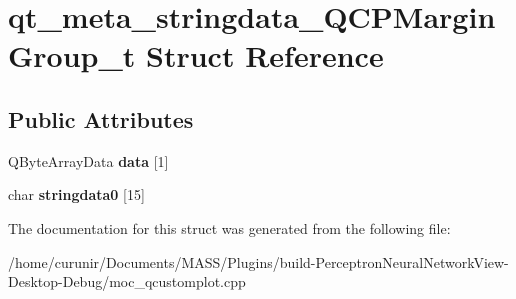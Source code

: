 \hypertarget{structqt__meta__stringdata___q_c_p_margin_group__t}{}\section{qt\+\_\+meta\+\_\+stringdata\+\_\+\+Q\+C\+P\+Margin\+Group\+\_\+t Struct Reference}
\label{structqt__meta__stringdata___q_c_p_margin_group__t}
\subsection*{Public Attributes}
\begin{DoxyCompactItemize}
\item 
Q\+Byte\+Array\+Data {\bfseries data} \mbox{[}1\mbox{]}\hypertarget{structqt__meta__stringdata___q_c_p_margin_group__t_a99abe4f941bb7fbdfd988480fd5e6dc9}{}\label{structqt__meta__stringdata___q_c_p_margin_group__t_a99abe4f941bb7fbdfd988480fd5e6dc9}

\item 
char {\bfseries stringdata0} \mbox{[}15\mbox{]}\hypertarget{structqt__meta__stringdata___q_c_p_margin_group__t_aea2e8169d7b920f953fc3d240d03082b}{}\label{structqt__meta__stringdata___q_c_p_margin_group__t_aea2e8169d7b920f953fc3d240d03082b}

\end{DoxyCompactItemize}


The documentation for this struct was generated from the following file\+:\begin{DoxyCompactItemize}
\item 
/home/curunir/\+Documents/\+M\+A\+S\+S/\+Plugins/build-\/\+Perceptron\+Neural\+Network\+View-\/\+Desktop-\/\+Debug/moc\+\_\+qcustomplot.\+cpp\end{DoxyCompactItemize}
